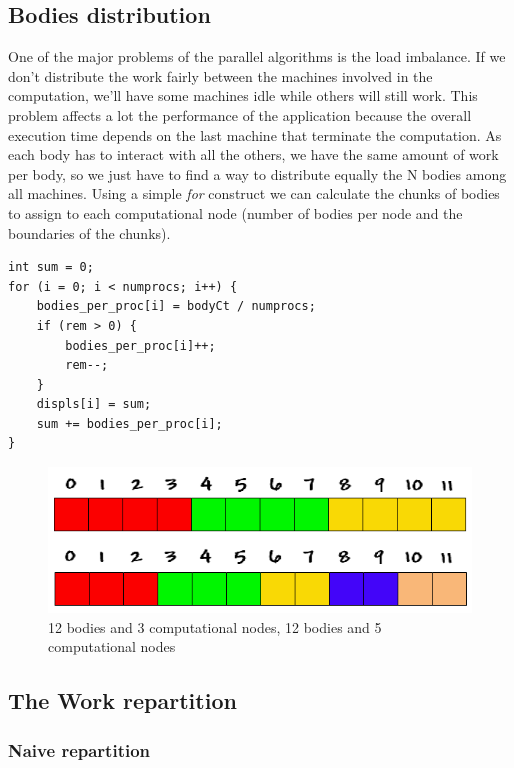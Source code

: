 \documentclass[a4paper]{article}
\begin{document}
\subsection{Bodies distribution}
\label{sec:bodies_distr}
One of the major problems of the parallel algorithms is the load imbalance. If we don't distribute the work fairly between the machines involved in the computation, we'll have some machines idle while others will still work. This problem affects a lot the performance of the application because the overall execution time depends on the last machine that terminate the computation. As each body has to interact with all the others, we have the same amount of work per body, so we just have to find a way to distribute equally the N bodies among all machines. Using a simple \textit{for} construct we can calculate the chunks of bodies to assign to each computational node (number of bodies per node and the boundaries of the chunks).

\begin{lstlisting}
int sum = 0;
for (i = 0; i < numprocs; i++) {
    bodies_per_proc[i] = bodyCt / numprocs;
    if (rem > 0) {
        bodies_per_proc[i]++;
        rem--;
    }
    displs[i] = sum;
    sum += bodies_per_proc[i];
}
\end{lstlisting}

\begin{figure}[ht]
  \centering\includegraphics[width=0.6\linewidth]{array_procs_both}
  \caption{12 bodies and 3 computational nodes, 12 bodies and 5 computational nodes}
  \label{fig:3nodes}
\end{figure}
\FloatBarrier

\subsection{The Work repartition}
\label{sec:work_rep}

\subsubsection{Naive repartition}
\label{sec:naive_rep}
\end{document}
